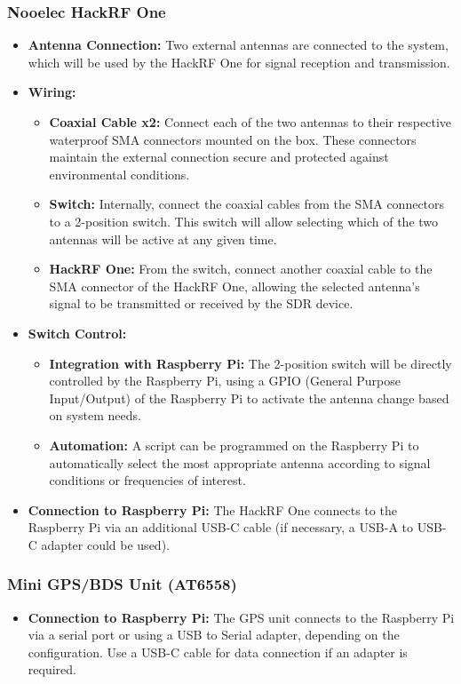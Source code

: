 \documentclass{article}
\begin{document}
\subsubsection{Nooelec HackRF One}
\begin{itemize}
    \item \textbf{Antenna Connection:} Two external antennas are connected to the system, which will be used by the HackRF One for signal reception and transmission.
    \item \textbf{Wiring:}
    \begin{itemize}
        \item \textbf{Coaxial Cable x2:} Connect each of the two antennas to their respective waterproof SMA connectors mounted on the box. These connectors maintain the external connection secure and protected against environmental conditions.
        \item \textbf{Switch:} Internally, connect the coaxial cables from the SMA connectors to a 2-position switch. This switch will allow selecting which of the two antennas will be active at any given time.
        \item \textbf{HackRF One:} From the switch, connect another coaxial cable to the SMA connector of the HackRF One, allowing the selected antenna's signal to be transmitted or received by the SDR device.
    \end{itemize}
    \item \textbf{Switch Control:}
    \begin{itemize}
        \item \textbf{Integration with Raspberry Pi:} The 2-position switch will be directly controlled by the Raspberry Pi, using a GPIO (General Purpose Input/Output) of the Raspberry Pi to activate the antenna change based on system needs.
        \item \textbf{Automation:} A script can be programmed on the Raspberry Pi to automatically select the most appropriate antenna according to signal conditions or frequencies of interest.
    \end{itemize}
    \item \textbf{Connection to Raspberry Pi:} The HackRF One connects to the Raspberry Pi via an additional USB-C cable (if necessary, a USB-A to USB-C adapter could be used).
\end{itemize}

\subsubsection{Mini GPS/BDS Unit (AT6558)}
\begin{itemize}
    \item \textbf{Connection to Raspberry Pi:} The GPS unit connects to the Raspberry Pi via a serial port or using a USB to Serial adapter, depending on the configuration. Use a USB-C cable for data connection if an adapter is required.
\end{itemize}
\end{document}
